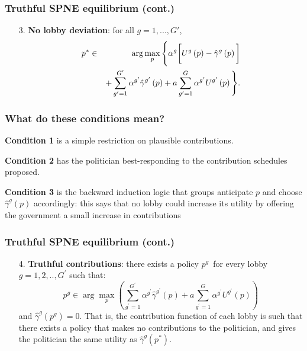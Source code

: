 \documentclass[11pt,aspectratio=169]{beamer}
\begin{document}
\begin{frame}
\frametitle{Truthful SPNE equilibrium (cont.)}

\begin{theorem}
\begin{enumerate}
\item[3.]  \textbf{No lobby deviation}: for all  $g=1,...,G'$, \begin{eqnarray}
p^* &\in &\arg \max_{p}\Bigg\{\alpha ^{g}\bigg[ U^{g}\left( p\right) -\hat{\gamma}^{g}\left( p\right) \bigg] \label{Grossman Helpman condition} \\
&&+\sum_{g^{\prime }=1}^{G^{\prime }}\alpha ^{g^{\prime }}\hat{\gamma}%
^{g^{\prime }}\left( p\right) +a\sum_{g^{\prime }=1}^{G}\alpha ^{g^{\prime
}}U^{g^{\prime }}\left( p\right) \Bigg\}.  \notag
\end{eqnarray}
\end{enumerate}
\end{theorem}


\end{frame}

\begin{frame}

\frametitle{What do these conditions mean?}

\textbf{Condition 1} is a simple restriction on plausible contributions. 


\textbf{Condition 2} has the politician best-responding to the contribution schedules proposed. 


\textbf{Condition 3} is the backward induction logic that groups anticipate $p$ and choose $\hat{\gamma}^g(p)$ accordingly: this says that no lobby could increase its utility by offering the government a small increase in contributions



\end{frame}

\begin{frame}
\frametitle{Truthful SPNE equilibrium (cont.)}

\begin{theorem}
\begin{enumerate}
\item[4.] \textbf{Truthful contributions}: there exists a policy $p^{g}$\ for every lobby $g=1,2,..,G^{\prime }$ such that:
\begin{equation*}
p^{g}\in \arg \max_{p}\left( \sum_{g^{\prime }=1}^{G^{\prime }}\alpha
^{g^{\prime }}\hat{\gamma}^{g^{\prime }}\left( p\right) +a\sum_{g^{\prime
}=1}^{G}\alpha ^{g^{\prime }}U^{g^{\prime }}\left( p\right) \right) 
\end{equation*} and $\hat{\gamma}^{g}\left( p^{g}\right) =0$. That is, the contribution function of each lobby is such that there exists a policy that makes no contributions to the politician, and gives the politician the same utility as $\hat{\gamma}^{g}\left( p^*\right)$.
\end{enumerate}
\end{theorem}
\end{frame}
\end{document}
